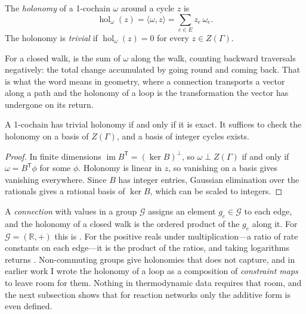 \begin{definition}[Holonomy]
\label{c1:def-holonomy}
The \emph{holonomy} of a 1-cochain $\omega$ around a cycle $z$ is
\begin{equation}
\operatorname{hol}_\omega(z)=\langle\omega,z\rangle=\sum_{e\in E}z_e\,\omega_e .
\label{c1:eq-hol}
\end{equation}
The holonomy is \emph{trivial} if $\operatorname{hol}_\omega(z)=0$ for every
$z\in Z(\Gamma)$.
\end{definition}

For a closed walk,  is the sum of $\omega$ along the walk,
counting backward traversals negatively: the total change accumulated by
going round and coming back. That is what the word means in geometry,
where a connection transports a vector along a path and the holonomy of a
loop is the transformation the vector has undergone on its return.

\begin{theorem}
\label{c1:thm-exact}
\lnkD{} A 1-cochain has trivial holonomy if and only if it is exact. It
suffices to check the holonomy on a basis of $Z(\Gamma)$, and a basis of
integer cycles exists.
\end{theorem}

\begin{proof}
In finite dimensions $\operatorname{im}B^{\mathsf T}=(\ker B)^{\perp}$, so
$\omega\perp Z(\Gamma)$ if and only if $\omega=B^{\mathsf T}\phi$ for some
$\phi$. Holonomy is linear in $z$, so vanishing on a basis gives vanishing
everywhere. Since $B$ has integer entries, Gaussian elimination over the
rationals gives a rational basis of $\ker B$, which can be scaled to integers.
\end{proof}

\begin{remark}
\label{c1:rem-group}
A \emph{connection} with values in a group $\mathcal G$ assigns an element
$g_e\in\mathcal G$ to each edge, and the holonomy of a closed walk is the
ordered product of the $g_e$ along it. For $\mathcal G=(\mathbb R,+)$ this is
. For the positive reals under multiplication---a ratio of
rate constants on each edge---it is the product of the ratios, and taking
logarithms returns . Non-commuting groups give holonomies
that  does not capture, and in earlier work I wrote the
holonomy of a loop as a composition of \emph{constraint maps} to leave room
for them. Nothing in thermodynamic data requires that room, and the next
subsection shows that for reaction networks only the additive form is even
defined.
\end{remark}

